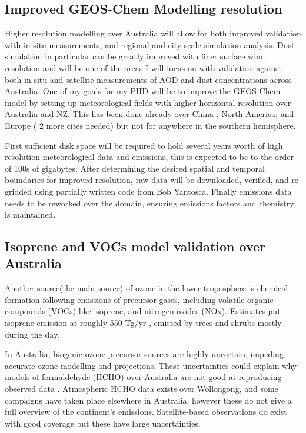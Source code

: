 \subsection{Improved GEOS-Chem Modelling resolution}
Higher resolution modelling over Australia will allow for both improved validation with in situ measurements, and regional and city scale simulation analysis. 
Dust simulation in particular can be greatly improved with finer surface wind resolution and will be one of the areas I will focus on with validation against both in situ and satellite measurements of AOD and dust concentrations across Australia.
One of my goals for my PHD will be to improve the GEOS-Chem model by setting up meteorological fields with higher horizontal resolution over Australia and NZ.
This has been done already over China \cite{Chen_2009}, North America, and Europe ( 2 more cites needed) but not for anywhere in the southern hemisphere.

First sufficient disk space will be required to hold several years worth of high resolution meteorological data and emissions, this is expected to be to the order of 100s of gigabytes.
After determining the desired spatial and temporal boundaries for improved resolution, raw data will be downloaded, verified, and re-gridded using partially written code from Bob Yantosca.
Finally emissions data needs to be reworked over the domain, ensuring emissions factors and chemistry is maintained.

\subsection{Isoprene and VOCs model validation over Australia}
Another source(the main source) of ozone in the lower troposphere is chemical formation following emissions of precursor gases, including volatile organic compounds (VOCs) like isoprene, and nitrogen oxides (NOx).
Estimates put isoprene emission at roughly 550 Tg/yr \cite{Guenther_2006, Monks_2014}, emitted by trees and shrubs mostly during the day.

In Australia, biogenic ozone precursor sources are highly uncertain, impeding accurate ozone modelling and projections. These uncertainties could explain why models of formaldehyde (HCHO) over Australia are not good at reproducing observed data \cite{Stavrakou_2009}. Atmospheric HCHO data exists over Wollongong, and some campaigns have taken place elsewhere in Australia, however these do not give a full overview of the continent's emissions. Satellite-based observations do exist with good coverage but these have large uncertainties. 

